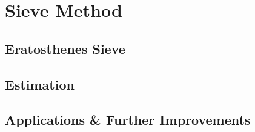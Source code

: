 
\section{Sieve Method}

\subsection{Eratosthenes Sieve}




\subsection{Estimation}


\subsection{Applications \& Further Improvements}

